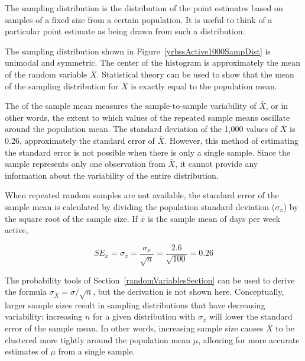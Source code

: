 \begin{spacing}{1.5}
\begin{termBox}{
The sampling distribution is the distribution of the point estimates based on samples of a fixed size from a certain population. It is useful to think of a particular point estimate as being drawn from such a distribution.}
\end{termBox}

The sampling distribution shown in Figure~\ref{yrbssActive1000SampDist} is unimodal and symmetric. The center of the histogram is approximately the mean of the random variable $\overline{X}$. Statistical theory can be used to show that the mean of the sampling distribution for $\overline{X}$ is exactly equal to the population mean. 

The  of the sample mean measures the sample-to-sample variability of $\overline{X}$, or in other words, the extent to which values of the repeated sample means oscillate around the population mean. The standard deviation of the 1,000 values of $\overline{X}$ is 0.26, approximately the standard error of $\overline{X}$. However, this method of estimating the standard error is not possible when there is only a single sample. Since the sample represents only one observation from $\overline{X}$, it cannot provide any information about the variability of the entire distribution.

When repeated random samples are not available, the standard error of the sample mean is calculated by dividing the population standard deviation ($\sigma_{x}$) by the square root of the sample size. If $\overline{x}$ is the sample mean of days per week active,

\[SE_{\overline{x}} = \sigma_{\overline{x}} = \dfrac{\sigma_{x}}{\sqrt{n}} = \dfrac{2.6}{\sqrt{100}} = 0.26\]

The probability tools of Section~\ref{randomVariablesSection} can be used to derive the formula $\sigma_{\overline{X}} = \sigma/\sqrt{n}$, but the derivation is not shown here. Conceptually, larger sample sizes result in sampling distributions that have decreasing variability; increasing $n$ for a given distribution with $\sigma_{x}$ will lower the standard error of the sample mean. In other words, increasing sample size causes $\overline{X}$ to be clustered more tightly around the population mean $\mu$, allowing for more accurate estimates of $\mu$ from a single sample.



\end{spacing}
